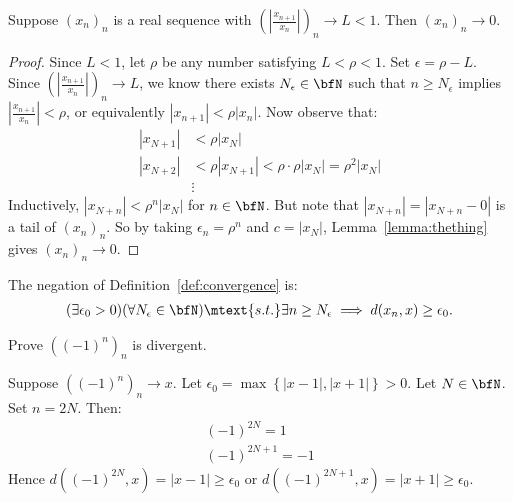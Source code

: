     \begin{proposition}
        Suppose $(x_n)_n$ is a real sequence with $\left(\left|\frac{x_{n+1}}{x_n}\right|\right)_n \rightarrow L < 1$. Then $(x_n)_n \rightarrow 0$.
    \end{proposition}
        \begin{proof}
            Since $L<1$, let $\rho$ be any number satisfying $L < \rho < 1$. Set $\epsilon = \rho - L$. Since $\left(\left|\frac{x_{n+1}}{x_n}\right|\right)_n \rightarrow L$, we know there exists $N_\epsilon \in \bfN$ such that $n \geq N_\epsilon$ implies $\left|\frac{x_{n+1}}{x_n}\right| < \rho$, or equivalently $|x_{n+1}| < \rho|x_n|$. Now observe that:
                \begin{equation*}
                \begin{split}
                    |x_{N+1}| &< \rho|x_N| \\
                    |x_{N+2}| &< \rho|x_{N+1}| < \rho \cdot \rho |x_N| = \rho^2 |x_N|\\
                    &\vdots
                \end{split}
                \end{equation*}
            Inductively, $|x_{N+n}| < \rho^n|x_N|$ for $n \in \bfN$. But note that $|x_{N+n}| = |x_{N+n} - 0|$ is a tail of $(x_n)_n$. So by taking $\epsilon_n = \rho^n$ and $c = |x_N|$, Lemma~\ref{lemma:thething} gives $(x_n)_n \rightarrow 0$.
        \end{proof}

    \begin{note}
        The negation of Definition~\ref{def:convergence} is:
            \begin{equation*}
            \begin{split}
                (\exists \epsilon_0 > 0)(\forall N_\epsilon \in \bfN) \mtext{s.t.} \exists n \geq N_\epsilon \implies d(x_n,x) \geq \epsilon_0.
            \end{split}
            \end{equation*}
    \end{note}

    \begin{example}
        Prove $((-1)^n)_n$ is divergent.
    \end{example}
        \begin{solution}
            Suppose $((-1)^n)_n \rightarrow x$. Let $\epsilon_0 = \max \left\{|x-1|,|x+1|\right\} > 0$. Let $N \in \bfN$. Set $n = 2N$. Then:
                \begin{equation*}
                \begin{split}
                    (-1)^{2N} = 1 \\
                    (-1)^{2N+1} = -1
                \end{split}
                \end{equation*}
            Hence $d((-1)^{2N},x) = |x-1| \geq \epsilon_0$ or $d((-1)^{2N+1},x) = |x+1| \geq \epsilon_0$.
        \end{solution}

